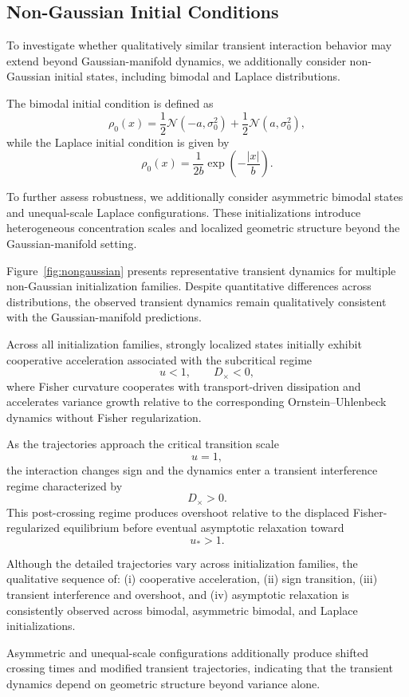\documentclass[aps,prl,twocolumn,10pt,superscriptaddress]{revtex4-2}
\begin{document}
\subsection{Non-Gaussian Initial Conditions}

To investigate whether qualitatively similar transient interaction behavior may extend beyond Gaussian-manifold dynamics, we additionally consider non-Gaussian initial states, including bimodal and Laplace distributions.

The bimodal initial condition is defined as
\[
\rho_0(x)
=
\frac12
\mathcal{N}(-a,\sigma_0^2)
+
\frac12
\mathcal{N}(a,\sigma_0^2),
\]
while the Laplace initial condition is given by
\[
\rho_0(x)
=
\frac{1}{2b}
\exp\left(
-\frac{|x|}{b}
\right).
\]

To further assess robustness, we additionally consider asymmetric bimodal states and unequal-scale Laplace configurations. These initializations introduce heterogeneous concentration scales and localized geometric structure beyond the Gaussian-manifold setting.

Figure~\ref{fig:nongaussian} presents representative transient dynamics for multiple non-Gaussian initialization families. Despite quantitative differences across distributions, the observed transient dynamics remain qualitatively consistent with the Gaussian-manifold predictions.

Across all initialization families, strongly localized states initially exhibit cooperative acceleration associated with the subcritical regime
\[
u<1,
\qquad
D_\times<0,
\]
where Fisher curvature cooperates with transport-driven dissipation and accelerates variance growth relative to the corresponding Ornstein--Uhlenbeck dynamics without Fisher regularization.

As the trajectories approach the critical transition scale
\[
u=1,
\]
the interaction changes sign and the dynamics enter a transient interference regime characterized by
\[
D_\times>0.
\]
This post-crossing regime produces overshoot relative to the displaced Fisher-regularized equilibrium before eventual asymptotic relaxation toward
\[
u_\ast>1.
\]

Although the detailed trajectories vary across initialization families, the qualitative sequence of:
(i) cooperative acceleration,
(ii) sign transition,
(iii) transient interference and overshoot,
and
(iv) asymptotic relaxation
is consistently observed across bimodal, asymmetric bimodal, and Laplace initializations.

Asymmetric and unequal-scale configurations additionally produce shifted crossing times and modified transient trajectories, indicating that the transient dynamics depend on geometric structure beyond variance alone.
\end{document}
